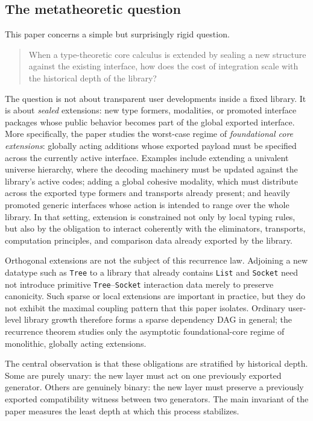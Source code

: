 \documentclass{lmcs}
\begin{document}
\subsection{The metatheoretic question}

This paper concerns a simple but surprisingly rigid question.

\begin{quote}
When a type-theoretic core calculus is extended by sealing a new structure against the existing interface, how does the cost of integration scale with the historical depth of the library?
\end{quote}

The question is not about transparent user developments inside a fixed library. It is about \emph{sealed} extensions: new type formers, modalities, or promoted interface packages whose public behavior becomes part of the global exported interface. More specifically, the paper studies the worst-case regime of \emph{foundational core extensions}: globally acting additions whose exported payload must be specified across the currently active interface. Examples include extending a univalent universe hierarchy, where the decoding machinery must be updated against the library's active codes; adding a global cohesive modality, which must distribute across the exported type formers and transports already present; and heavily promoted generic interfaces whose action is intended to range over the whole library. In that setting, extension is constrained not only by local typing rules, but also by the obligation to interact coherently with the eliminators, transports, computation principles, and comparison data already exported by the library.

Orthogonal extensions are not the subject of this recurrence law. Adjoining a new datatype such as \texttt{Tree} to a library that already contains \texttt{List} and \texttt{Socket} need not introduce primitive \texttt{Tree}--\texttt{Socket} interaction data merely to preserve canonicity. Such sparse or local extensions are important in practice, but they do not exhibit the maximal coupling pattern that this paper isolates. Ordinary user-level library growth therefore forms a sparse dependency DAG in general; the recurrence theorem studies only the asymptotic foundational-core regime of monolithic, globally acting extensions.

The central observation is that these obligations are stratified by historical depth. Some are purely unary: the new layer must act on one previously exported generator. Others are genuinely binary: the new layer must preserve a previously exported compatibility witness between two generators. The main invariant of the paper measures the least depth at which this process stabilizes.
\end{document}
